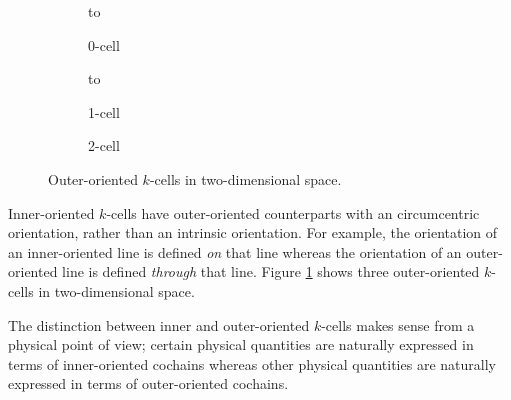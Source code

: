\begin{figure}[ht]
    \newsavebox\outerBox
    \centering
    \begin{subfigure}[c]{0.3\textwidth}
        \centering
        \vbox to \ht{}
        \caption{0-cell}
    \end{subfigure}
    \begin{subfigure}[c]{0.3\textwidth}
        \centering
        \vbox to \ht{}
        \caption{1-cell}
    \end{subfigure}
    \begin{subfigure}[c]{0.3\textwidth}
        \centering
        \usebox{\outerBox}
        \caption{2-cell}
    \end{subfigure}
    \caption{Outer-oriented $k$-cells in two-dimensional space.}
    \label{fig:outerExample}
\end{figure}

Inner-oriented $k$-cells have outer-oriented counterparts with an circumcentric orientation, rather than an intrinsic orientation. For example, the orientation of an inner-oriented line is defined \emph{on} that line whereas the orientation of an outer-oriented line is defined \emph{through} that line. Figure \ref{fig:outerExample} shows three outer-oriented $k$-cells in two-dimensional space.

The distinction between inner and outer-oriented $k$-cells makes sense from a physical point of view; certain physical quantities are naturally expressed in terms of inner-oriented cochains whereas other physical quantities are naturally expressed in terms of outer-oriented cochains.


